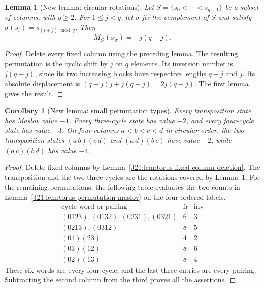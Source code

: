 \documentclass[11pt,oneside]{report}
\newtheorem{lemma}[theorem]{Lemma}
\newtheorem{corollary}[theorem]{Corollary}
\theoremstyle{definition}
\numberwithin{equation}{section}
\begin{document}
\begin{lemma}[New lemma: circular rotations]
\label{J21:lem:torus-rotation-maslov}
Let $S=\{s_0<\cdots<s_{q-1}\}$ be a subset of columns, with $q\geq2$.
For $1\leq j<q$, let $\sigma$ fix the complement of $S$ and satisfy
$\sigma(s_i)=s_{(i+j)\bmod q}$. Then
\[
 M_O(x_\sigma)=-j(q-j).
\]
\end{lemma}
\begin{proof}
Delete every fixed column using the preceding lemma. The resulting
permutation is the cyclic shift by $j$ on $q$ elements. Its inversion
number is $j(q-j)$, since its two increasing blocks have respective
lengths $q-j$ and $j$. Its absolute displacement is
$(q-j)j+j(q-j)=2j(q-j)$. The first lemma gives the result.
\end{proof}

\begin{corollary}[New lemma: small permutation types]
\label{J21:cor:torus-small-types}
Every transposition state has Maslov value $-1$. Every three-cycle
state has value $-2$, and every four-cycle state has value $-3$.
On four columns $a<b<c<d$ in circular order, the two-transposition
states $(a\,b)(c\,d)$ and $(a\,d)(b\,c)$ have value $-2$, while
$(a\,c)(b\,d)$ has value $-4$.
\end{corollary}
\begin{proof}
Delete fixed columns by Lemma~\ref{J21:lem:torus-fixed-column-deletion}.
The transposition and the two three-cycles are the rotations covered by
Lemma~\ref{J21:lem:torus-rotation-maslov}. For the remaining permutations,
the following table evaluates the two counts in
Lemma~\ref{J21:lem:torus-permutation-maslov} on the four ordered labels.
\[
\begin{array}{c|r|r}
 \text{cycle word or pairing}&\operatorname{fr}&\operatorname{inv}\\\hline
 (0123),(0132),(0231),(0321)&6&3\\
 (0213),(0312)&8&5\\
 (01)(23)&4&2\\
 (03)(12)&8&6\\
 (02)(13)&8&4
\end{array}
\]
These six words are every four-cycle, and the last three entries are
every pairing. Subtracting the second column from the third proves all
the assertions.
\end{proof}
\end{document}
